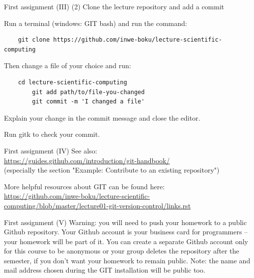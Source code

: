 \documentclass[10pt,color=usenames,dvipsnames]{beamer}
\begin{document}
\begin{frame}[fragile]{First assignment (III)}
	(2) Clone the lecture repository and add a commit

	Run a terminal (windows: GIT bash) and run the command:

    {\small
        \begin{verbatim}
    git clone https://github.com/inwe-boku/lecture-scientific-computing
        \end{verbatim}
    }

	Then change a file of your choice and run:

	\begin{verbatim}
    cd lecture-scientific-computing
	    git add path/to/file-you-changed
	    git commit -m 'I changed a file'
	\end{verbatim}

	Explain your change in the commit message and close the editor.

	Run gitk to check your commit.

\end{frame}

\begin{frame}[fragile]{First assignment (IV)}
	See also:\\
	\href{https://guides.github.com/introduction/git-handbook/}{https://guides.github.com/introduction/git-handbook/}\\
	(especially the section "Example: Contribute to an existing repository")
    \bigskip

	More helpful resources about GIT can be found here:\\
	\href{https://github.com/inwe-boku/lecture-scientific-computing/blob/master/lecture01-git-version-control/links.rst}
	{https://github.com/inwe-boku/lecture-scientific-computing/blob/master/lecture01-git-version-control/links.rst}
\end{frame}

\begin{frame}{First assignment (V)}
    Warning: you will need to push your homework to a public Github repository. Your Github account
    is your business card for programmers -- your homework will be part of it. You can create a
    separate Github account only for this course to be anonymous or your group deletes the
    repository after the semester, if you don't want your homework to remain public. Note: the name
    and mail address chosen during the GIT installation will be public too.
\end{frame}
\end{document}
